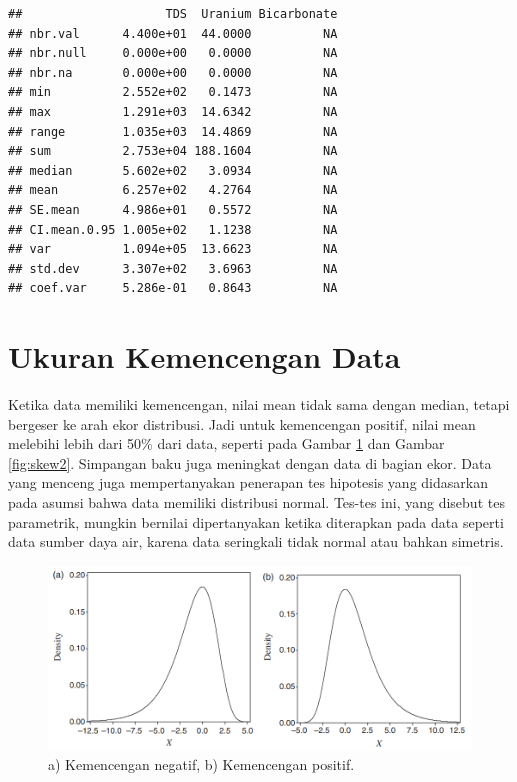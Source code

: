 \documentclass[]{book}
\begin{document}
\begin{verbatim}
##                    TDS  Uranium Bicarbonate
## nbr.val      4.400e+01  44.0000          NA
## nbr.null     0.000e+00   0.0000          NA
## nbr.na       0.000e+00   0.0000          NA
## min          2.552e+02   0.1473          NA
## max          1.291e+03  14.6342          NA
## range        1.035e+03  14.4869          NA
## sum          2.753e+04 188.1604          NA
## median       5.602e+02   3.0934          NA
## mean         6.257e+02   4.2764          NA
## SE.mean      4.986e+01   0.5572          NA
## CI.mean.0.95 1.005e+02   1.1238          NA
## var          1.094e+05  13.6623          NA
## std.dev      3.307e+02   3.6963          NA
## coef.var     5.286e-01   0.8643          NA
\end{verbatim}

\section{Ukuran Kemencengan Data}\label{ukuran-kemencengan-data}

Ketika data memiliki kemencengan, nilai mean tidak sama dengan median,
tetapi bergeser ke arah ekor distribusi. Jadi untuk kemencengan positif,
nilai mean melebihi lebih dari 50\% dari data, seperti pada Gambar
\ref{fig:skew} dan Gambar \ref{fig:skew2}. Simpangan baku juga meningkat
dengan data di bagian ekor. Data yang menceng juga mempertanyakan
penerapan tes hipotesis yang didasarkan pada asumsi bahwa data memiliki
distribusi normal. Tes-tes ini, yang disebut tes parametrik, mungkin
bernilai dipertanyakan ketika diterapkan pada data seperti data sumber
daya air, karena data seringkali tidak normal atau bahkan simetris.

\begin{figure}

{\centering \includegraphics[width=0.7\linewidth]{skewness} 

}

\caption{a) Kemencengan negatif, b) Kemencengan positif.}\label{fig:skew}
\end{figure}
\end{document}
